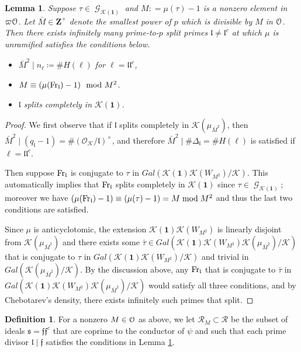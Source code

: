 \documentclass[leqno]{amsart}
\newtheorem{lem}[thm]{Lemma}
\theoremstyle{definition}
\newtheorem{defn}[thm]{Definition}
\theoremstyle{remark}
\newcommand{\id}{\mathbf{1}}
\newcommand{\oo}{\mathcal{O}}
\newcommand{\eo}{\EuScript{O}}
\newcommand{\Z}{{\mathbf{Z}}}
\DeclareMathOperator{\Gal}{\mathcal{G}}
\newcommand{\Fr}{\textnormal{Fr}} %
\newcommand{\ff}{\mathfrak{f}}
\newcommand{\fl}{\mathfrak{l}}
\newcommand{\fs}{\mathfrak{s}}
\newcommand{\K}{{\mathcal{K}}} %
\begin{document}
\begin{lem}\label{lem:estimate}
Suppose $\tau\in \Gal_{\K(\id)}$ and
$M\colon=\mu(\tau)-1$ is a nonzero element in $\varpi\eo$.
Let $\bar{M}\in\Z^+$
denote the smallest power of $p$
which is divisible by $M$ in $\eo$.
Then there exists infinitely many 
prime-to-$p$ split primes $\fl\neq\fl^c$
at which $\mu$ is unramified satisfies the conditions below.
\begin{itemize}
\item $\bar{M}^2\mid n_\ell\coloneqq \#H(\ell)$ for $\ell=\fl\fl^c$,
\item $M\equiv (\mu(\Fr_\fl)-1)\mod M^2$.
\item $\fl$ splits completely in $\K(\id)$.
\end{itemize}
\end{lem}
\begin{proof}

We first observe that if $\fl$ splits completely in 
$\K(\mu_{\bar{M}^2})$, then
$\bar{M}^2\mid (q_\fl-1)=\#(\oo_\K/\fl)^\times$,
and therefore $\bar{M}^2\mid \#\Delta_\fl=\#H(\ell)$
is satisfied if $\ell=\fl\fl^c$.

Then suppose $\Fr_\fl$ is conjugate to $\tau$
in $Gal(\K(\id)\K(W_{M^2})/\K)$.
This automatically implies that $\Fr_\fl$ splits completely 
in $\K(\id)$ since $\tau\in\Gal_{\K(\id)}$;
moreover we have
$(\mu(\Fr_\fl)-1)\equiv (\mu(\tau)-1)=M\bmod M^2$
and thus the last two conditions are satisfied.

Since $\mu$ is anticyclotomic,
the extension $\K(\id)\K(W_{M^2})$
is linearly disjoint from 
$\K(\mu_{\bar{M}^2})$
and there exists some $\bar{\tau}\in 
Gal(\K(\id)\K(W_{M^2})\K(\mu_{\bar{M}^2})/\K)$
that is conjugate to $\tau$ in 
$Gal(\K(\id)\K(W_{M^2})/\K)$
and trivial in 
$Gal(\K(\mu_{\bar{M}^2})/\K)$.
By the discussion above, any $\Fr_\fl$ 
that is conjugate to $\bar{\tau}$ in
$Gal(\K(\id)\K(W_{M^2})\K(\mu_{\bar{M}^2})/\K)$
would satisfy all three conditions,
and by Chebotarev's density,
there exists infinitely such primes that split.
    
\end{proof}

\begin{defn}\label{def:RM}
For a nonzero $M\in \eo$ as above,
we let $\mathcal{R}_M\subset \mathcal{R}$
be the subset of ideals $\fs=\ff\ff^c$
that are coprime to the conductor of $\psi$
and such that each prime divisor $\fl\mid \ff$
satisfies the conditions in Lemma \ref{lem:estimate}.
\end{defn}
\end{document}
